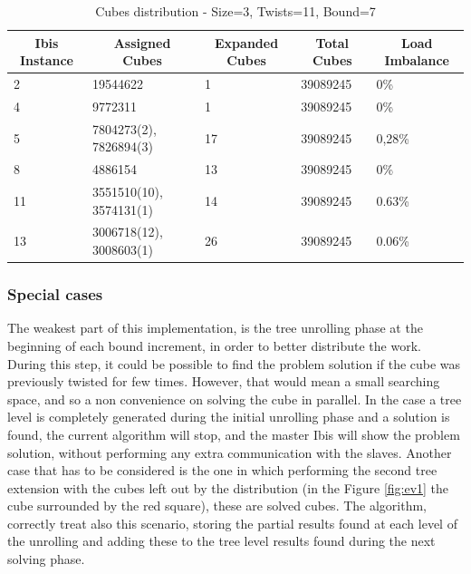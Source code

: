 \documentclass[a4paper]{article}
\begin{document}
\begin{table}[!ht]
\centering
\caption{Cubes distribution - Size=3, Twists=11, Bound=7}
\label{table:tlow}
\begin{tabular}{l|l|l|l|l}
\multicolumn{1}{c}{\bfseries Ibis Instance} & \multicolumn{1}{c}{\bfseries Assigned Cubes} & \multicolumn{1}{c}{\bfseries Expanded Cubes} & \multicolumn{1}{c}{\bfseries Total Cubes} & \multicolumn{1}{c}{\bfseries Load Imbalance} \\ \hline
2 & 19544622 & 1 & 39089245 & 0\%  \\ \hline
4 & 9772311 & 1 & 39089245 & 0\% \\ \hline
5 & 7804273(2), 7826894(3) & 17 & 39089245 & 0,28\% \\ \hline
8 & 4886154 & 13 & 39089245 & 0\% \\ \hline
11 & 3551510(10), 3574131(1) & 14 & 39089245 & 0.63\% \\ \hline
13 & 3006718(12), 3008603(1) & 26 & 39089245 & 0.06\%
\end{tabular}
\end{table}
\FloatBarrier

\subsubsection{Special cases}
\label{sec:sc}
The weakest part of this implementation, is the tree unrolling phase at the beginning of each bound increment, in order to better distribute the work. During this step, it could be possible to find the problem solution if the cube was previously twisted for few times. However, that would mean a small searching space, and so a non convenience on solving the cube in parallel. In the case a tree level is completely generated during the initial unrolling phase and a solution is found, the current algorithm will stop, and the master Ibis will show the problem solution, without performing any extra communication with the slaves. Another case that has to be considered is the one in which performing the second tree extension with the cubes left out by the distribution (in the Figure \ref{fig:ev1} the cube surrounded by the red square), these are solved cubes. The algorithm, correctly treat also this scenario, storing the partial results found at each level of the unrolling and adding these to the tree level results found during the next solving phase.
\end{document}
